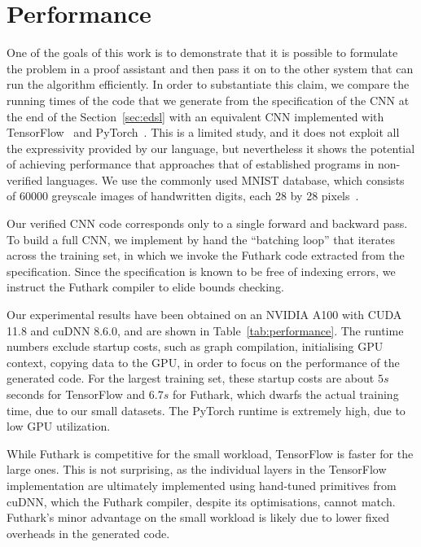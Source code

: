 \section{Performance\label{sec:performance}}

One of the goals of this work is to demonstrate that it is possible to
formulate the problem in a proof assistant and then pass it on to the
other system that can run the algorithm efficiently. In order to
substantiate this claim, we compare the running times of the code that
we generate from the specification of the CNN at the end of the
Section~\ref{sec:edsl} with an equivalent CNN implemented with
TensorFlow~\cite{ad-tf} and PyTorch~\cite{ad-pytorch}. This is a
limited study, and it does not exploit all the expressivity provided
by our language, but nevertheless it shows the potential of achieving
performance that approaches that of established programs in
non-verified languages. We use the commonly used MNIST database, which
consists of 60000 greyscale images of handwritten digits, each 28 by
28 pixels~\cite{deng2012mnist}.

Our verified CNN code corresponds only to a single forward and
backward pass. To build a full CNN, we implement by hand the
``batching loop'' that iterates across the training set, in which we
invoke the Futhark code extracted from the specification. Since the
specification is known to be free of indexing errors, we instruct the
Futhark compiler to elide bounds checking.

Our experimental results have been obtained on an NVIDIA A100 with
CUDA 11.8 and cuDNN 8.6.0, and are shown in
Table~\ref{tab:performance}. The runtime numbers exclude startup
costs, such as graph compilation, initialising GPU context, copying
data to the GPU, in order to focus on the performance of the generated
code. For the largest training set, these startup costs are about $5s$
seconds for TensorFlow and $6.7s$ for Futhark, which dwarfs the actual
training time, due to our small datasets. The PyTorch runtime is
extremely high, due to low GPU utilization.

While Futhark is competitive for the small workload, TensorFlow is
faster for the large ones. This is not surprising, as the individual
layers in the TensorFlow implementation are ultimately implemented
using hand-tuned primitives from cuDNN, which the Futhark compiler,
despite its optimisations, cannot match. Futhark's minor advantage on
the small workload is likely due to lower fixed overheads in the
generated code.

